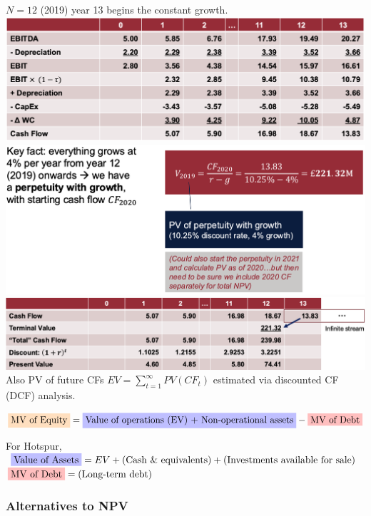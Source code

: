 $N = 12$ (2019) \ie year 13 begins the constant growth.
\includegraphics[width=\columnwidth]{CF.png}
\includegraphics[width=\columnwidth]{Terminal.png}
\includegraphics[width=\columnwidth]{DCF.png}
Also 
 PV of future CFs
$EV = \sum_{t=1}^{\infty} PV(CF_t)$
\ie estimated via discounted CF (DCF) analysis.

$\colorbox{orange!25}{\text{MV of Equity}}
= \colorbox{blue!25}{\text{Value of operations (EV) + Non-operational assets}}
- \colorbox{red!25}{\text{MV of Debt}}$

For Hotspur, $\colorbox{blue!25}{Value of Assets} = EV + \text{(Cash \& equivalents)} + \text{(Investments available for sale)}$
$\colorbox{red!25}{\text{MV of Debt}} = \text{(Long-term debt)}$

\subsubsection{Alternatives to NPV}

